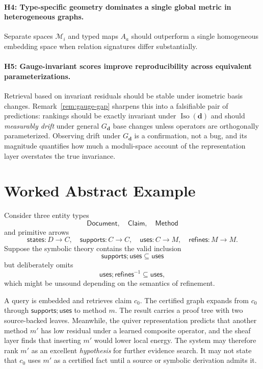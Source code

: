 \documentclass[11pt]{article}
\newcommand{\Iso}{\operatorname{Iso}}
\newcommand{\M}{\mathcal{M}}
\begin{document}
\paragraph{H4: Type-specific geometry dominates a single global metric in heterogeneous graphs.}
Separate spaces $\M_i$ and typed maps $A_a$ should outperform a single homogeneous embedding space when relation signatures differ substantially.

\paragraph{H5: Gauge-invariant scores improve reproducibility across equivalent parameterizations.}
Retrieval based on invariant residuals should be stable under isometric basis changes. Remark~\ref{rem:gauge-gap} sharpens this into a falsifiable pair of predictions: rankings should be exactly invariant under $\Iso(\bm d)$ and should \emph{measurably drift} under general $G_{\bm d}$ base changes unless operators are orthogonally parameterized. Observing drift under $G_{\bm d}$ is a confirmation, not a bug, and its magnitude quantifies how much a moduli-space account of the representation layer overstates the true invariance.

\section{Worked Abstract Example}

Consider three entity types
\[
\mathsf{Document},\quad \mathsf{Claim},\quad \mathsf{Method}
\]
and primitive arrows
\[
\mathsf{states}:D\to C,\quad
\mathsf{supports}:C\to C,\quad
\mathsf{uses}:C\to M,
\quad
\mathsf{refines}:M\to M.
\]
Suppose the symbolic theory contains the valid inclusion
\[
\mathsf{supports};\mathsf{uses}\subseteq\mathsf{uses}
\]
but deliberately omits
\[
\mathsf{uses};\mathsf{refines}^{-1}\subseteq\mathsf{uses},
\]
which might be unsound depending on the semantics of refinement.

A query is embedded and retrieves claim $c_0$. The certified graph expands from $c_0$ through $\mathsf{supports};\mathsf{uses}$ to method $m$. The result carries a proof tree with two source-backed leaves. Meanwhile, the quiver representation predicts that another method $m'$ has low residual under a learned composite operator, and the sheaf layer finds that inserting $m'$ would lower local energy. The system may therefore rank $m'$ as an excellent \emph{hypothesis} for further evidence search. It may not state that $c_0$ uses $m'$ as a certified fact until a source or symbolic derivation admits it.
\end{document}
